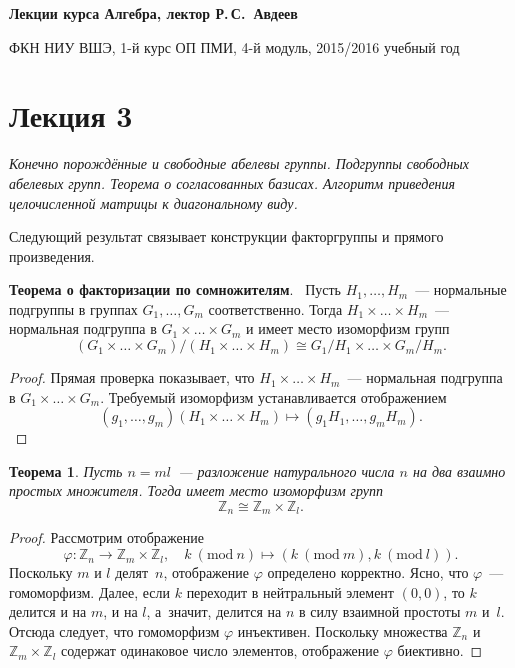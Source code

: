 \documentclass[a4paper,10pt]{amsart}
\def\ZZ{{\mathbb Z}}%
\newtheorem{theorem}{Теорема}
\theoremstyle{definition}
\theoremstyle{remark}
\begin{document}
%
\sloppy
%
\centerline{\large \bf Лекции курса \guillemotleft
Алгебра\guillemotright{}, лектор Р.\,С.~Авдеев}

\smallskip

\centerline{\large ФКН НИУ ВШЭ, 1-й курс ОП ПМИ, 4-й модуль,
2015/2016 учебный год}


\bigskip

\section*{Лекция 3}

\medskip

{\it Конечно порождённые и свободные абелевы группы. Подгруппы
свободных абелевых групп. Теорема о согласованных базисах. Алгоритм
приведения целочисленной матрицы к диагональному виду.}

\medskip

Следующий результат связывает конструкции факторгруппы и прямого
произведения.

{\bf Теорема о факторизации по сомножителям}. \ Пусть $H_1, \ldots,
H_m$~--- нормальные подгруппы в группах $G_1, \ldots, G_m$
соответственно. Тогда $H_1 \times \ldots \times H_m$~--- нормальная
подгруппа в $G_1 \times \ldots \times G_m$ и имеет место изоморфизм
групп
$$
(G_1 \times \ldots \times G_m) / (H_1 \times \ldots \times H_m)
\cong G_1 / H_1 \times \ldots \times G_m / H_m.
$$

\begin{proof}
Прямая проверка показывает, что $H_1\times\ldots\times H_m$~---
нормальная подгруппа в $G_1\times\ldots\times G_m$. Требуемый
изоморфизм устанавливается отображением
$$
(g_1,\ldots,g_m)(H_1\times\ldots\times H_m)\mapsto
(g_1H_1,\ldots,g_mH_m).
$$
\end{proof}

\begin{theorem}
Пусть $n=ml$~--- разложение натурального числа $n$ на два взаимно
простых множителя. Тогда имеет место изоморфизм групп
$$
\ZZ_n\cong \ZZ_m\times\ZZ_l.
$$
\end{theorem}

\begin{proof}
Рассмотрим отображение
$$
\varphi\colon \ZZ_n\to \ZZ_m\times\ZZ_l, \quad k \ (\text{mod}\ n)
\mapsto (k\ (\text{mod}\ m), k\ (\text{mod}\  l)).
$$
Поскольку $m$ и $l$ делят~$n$, отображение $\varphi$ определено
корректно. Ясно, что $\varphi$~--- гомоморфизм. Далее, если $k$
переходит в нейтральный элемент $(0,0)$, то $k$ делится и на $m$, и
на $l$, а~значит, делится на $n$ в силу взаимной простоты $m$ и~$l$.
Отсюда следует, что гомоморфизм $\varphi$ инъективен. Поскольку
множества $\ZZ_n$ и $\ZZ_m\times\ZZ_l$ содержат одинаковое число
элементов, отображение $\varphi$ биективно.
\end{proof}
\end{document}
